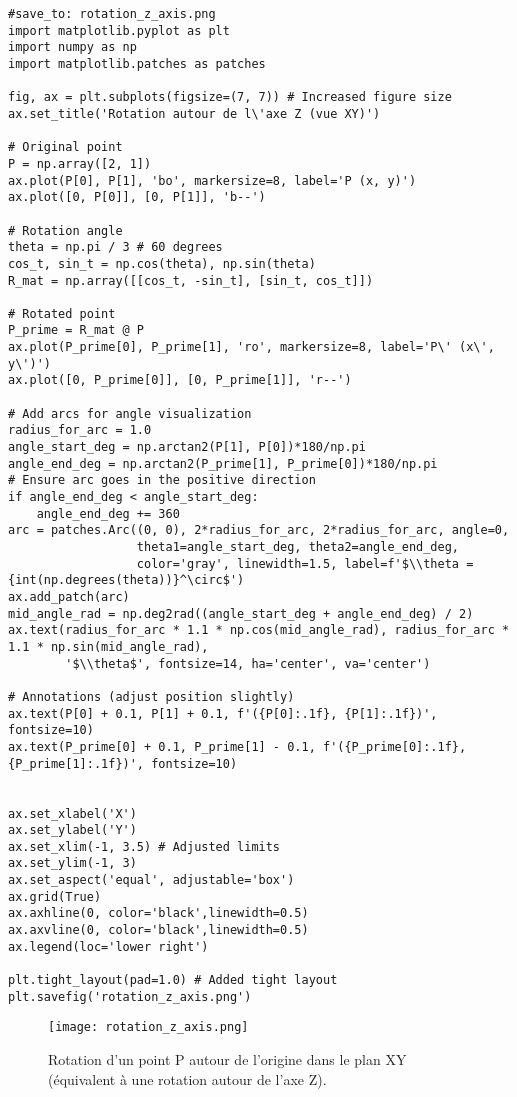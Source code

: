 \documentclass{article}
\begin{document}
\begin{verbatim}
#save_to: rotation_z_axis.png
import matplotlib.pyplot as plt
import numpy as np
import matplotlib.patches as patches

fig, ax = plt.subplots(figsize=(7, 7)) # Increased figure size
ax.set_title('Rotation autour de l\'axe Z (vue XY)')

# Original point
P = np.array([2, 1])
ax.plot(P[0], P[1], 'bo', markersize=8, label='P (x, y)')
ax.plot([0, P[0]], [0, P[1]], 'b--')

# Rotation angle
theta = np.pi / 3 # 60 degrees
cos_t, sin_t = np.cos(theta), np.sin(theta)
R_mat = np.array([[cos_t, -sin_t], [sin_t, cos_t]])

# Rotated point
P_prime = R_mat @ P
ax.plot(P_prime[0], P_prime[1], 'ro', markersize=8, label='P\' (x\', y\')')
ax.plot([0, P_prime[0]], [0, P_prime[1]], 'r--')

# Add arcs for angle visualization
radius_for_arc = 1.0
angle_start_deg = np.arctan2(P[1], P[0])*180/np.pi
angle_end_deg = np.arctan2(P_prime[1], P_prime[0])*180/np.pi
# Ensure arc goes in the positive direction
if angle_end_deg < angle_start_deg:
    angle_end_deg += 360
arc = patches.Arc((0, 0), 2*radius_for_arc, 2*radius_for_arc, angle=0,
                  theta1=angle_start_deg, theta2=angle_end_deg,
                  color='gray', linewidth=1.5, label=f'$\\theta = {int(np.degrees(theta))}^\circ$')
ax.add_patch(arc)
mid_angle_rad = np.deg2rad((angle_start_deg + angle_end_deg) / 2)
ax.text(radius_for_arc * 1.1 * np.cos(mid_angle_rad), radius_for_arc * 1.1 * np.sin(mid_angle_rad),
        '$\\theta$', fontsize=14, ha='center', va='center')

# Annotations (adjust position slightly)
ax.text(P[0] + 0.1, P[1] + 0.1, f'({P[0]:.1f}, {P[1]:.1f})', fontsize=10)
ax.text(P_prime[0] + 0.1, P_prime[1] - 0.1, f'({P_prime[0]:.1f}, {P_prime[1]:.1f})', fontsize=10)


ax.set_xlabel('X')
ax.set_ylabel('Y')
ax.set_xlim(-1, 3.5) # Adjusted limits
ax.set_ylim(-1, 3)
ax.set_aspect('equal', adjustable='box')
ax.grid(True)
ax.axhline(0, color='black',linewidth=0.5)
ax.axvline(0, color='black',linewidth=0.5)
ax.legend(loc='lower right')

plt.tight_layout(pad=1.0) # Added tight layout
plt.savefig('rotation_z_axis.png')
\end{verbatim}

\begin{figure}[H]
\centering
\texttt{[image: rotation\_z\_axis.png]} %
\caption{Rotation d'un point P autour de l'origine dans le plan XY (équivalent à une rotation autour de l'axe Z).}
\label{fig:rot_z}
\end{figure}
\end{document}
